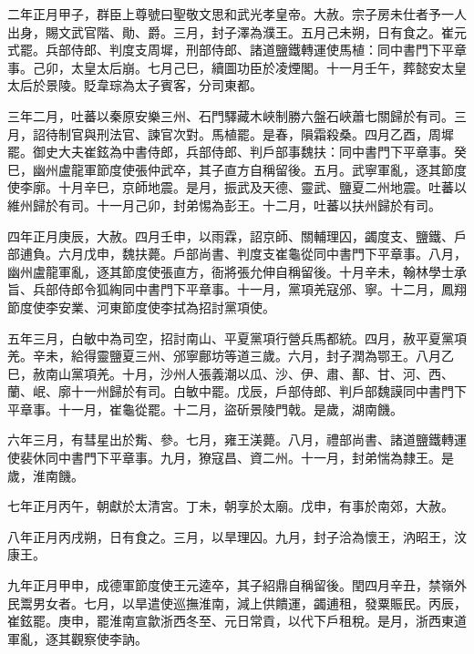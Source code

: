 \begin{pinyinscope}
 二年正月甲子，群臣上尊號曰聖敬文思和武光孝皇帝。大赦。宗子房未仕者予一人出身，賜文武官階、勛、爵。三月，封子澤為濮王。五月己未朔，日有食之。崔元式罷。兵部侍郎、判度支周墀，刑部侍郎、諸道鹽鐵轉運使馬植：同中書門下平章事。己卯，太皇太后崩。七月己巳，續圖功臣於凌煙閣。十一月壬午，葬懿安太皇太后於景陵。貶韋琮為太子賓客，分司東都。



 三年二月，吐蕃以秦原安樂三州、石門驛藏木峽制勝六盤石峽蕭七關歸於有司。三月，詔待制官與刑法官、諫官次對。馬植罷。是春，隕霜殺桑。四月乙酉，周墀罷。御史大夫崔鉉為中書侍郎，兵部侍郎、判戶部事魏扶：同中書門下平章事。癸巳，幽州盧龍軍節度使張仲武卒，其子直方自稱留後。五月。武寧軍亂，逐其節度使李廓。十月辛巳，京師地震。是月，振武及天德、靈武、鹽夏二州地震。吐蕃以維州歸於有司。十一月己卯，封弟惕為彭王。十二月，吐蕃以扶州歸於有司。



 四年正月庚辰，大赦。四月壬申，以雨霖，詔京師、關輔理囚，蠲度支、鹽鐵、戶部逋負。六月戊申，魏扶薨。戶部尚書、判度支崔龜從同中書門下平章事。八月，幽州盧龍軍亂，逐其節度使張直方，衙將張允伸自稱留後。十月辛未，翰林學士承旨、兵部侍郎令狐綯同中書門下平章事。十一月，黨項羌寇邠、寧。十二月，鳳翔節度使李安業、河東節度使李拭為招討黨項使。



 五年三月，白敏中為司空，招討南山、平夏黨項行營兵馬都統。四月，赦平夏黨項羌。辛未，給得靈鹽夏三州、邠寧鄜坊等道三歲。六月，封子潤為鄂王。八月乙巳，赦南山黨項羌。十月，沙州人張義潮以瓜、沙、伊、肅、鄯、甘、河、西、蘭、岷、廓十一州歸於有司。白敏中罷。戊辰，戶部侍郎、判戶部魏謨同中書門下平章事。十一月，崔龜從罷。十二月，盜斫景陵門戟。是歲，湖南饑。



 六年三月，有彗星出於觜、參。七月，雍王渼薨。八月，禮部尚書、諸道鹽鐵轉運使裴休同中書門下平章事。九月，獠寇昌、資二州。十一月，封弟惴為隸王。是歲，淮南饑。



 七年正月丙午，朝獻於太清宮。丁未，朝享於太廟。戊申，有事於南郊，大赦。



 八年正月丙戌朔，日有食之。三月，以旱理囚。九月，封子洽為懷王，汭昭王，汶康王。



 九年正月甲申，成德軍節度使王元逵卒，其子紹鼎自稱留後。閏四月辛丑，禁嶺外民鬻男女者。七月，以旱遣使巡撫淮南，減上供饋運，蠲逋租，發粟賑民。丙辰，崔鉉罷。庚申，罷淮南宣歙浙西冬至、元日常貢，以代下戶租稅。是月，浙西東道軍亂，逐其觀察使李訥。




\end{pinyinscope}
